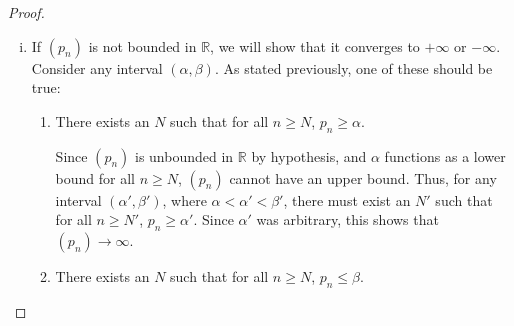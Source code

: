 \documentclass[12pt]{article}
\begin{document}
\begin{proof}
\begin{enumerate}[(i)]
                  Given our paraphrasing of what it means to be cross-bounded, there
                  either exists an $N$ such that for all $n\ge N$, $p_{n}\ge \alpha$, or
                  there exists an $N$ such that for all $n\ge N$, $p_{n} \leq \beta$. In both
                  cases, we have achieved new bounds for $(p_{n})$ for $n\ge N$, namely
                  $(\alpha, M)$ and $(m, \beta)$ respectively. Notice that
                  $M-a = \beta-m = \frac{3}{4}(M-m)$. Effectively, we have bounded a
                  tail of the sequence in an interval that is three-fourths the size of the
                  interval we started with. If we repeat this process $k$ times (always taking
                  the maximum of all the $N$'s we've chosen), we will bound a tail of
                  $(p_{n})$ in an interval of the size $\left( \frac{3}{4} \right)^{k}(M-m)$.
                  Taking the limit as $k\to \infty$,
                  $$
                        \lim_{ k \to \infty } (M-m)\left( \frac{3}{4} \right)^{k} = (M-m)\lim_{ k \to \infty }\left( \frac{3}{4} \right)^{k} = 0
                  $$
                  Thus, for arbitrary $\epsilon>0$, there will exist $k$ such
                  that $(M-m) \left( \frac{3}{4} \right)^{k}<\epsilon$, i.e, there will exist
                  a tail of $(p_{n})$ where the difference between any two terms is less
                  than $\epsilon$. This implies that $(p_{n})$ is Cauchy, and hence, convergent.
            \item If $(p_{n})$ is not bounded in $\mathbb{R}$, we will show that it converges
                  to $+\infty$ or $-\infty$. Consider any interval $(\alpha, \beta)$. As stated
                  previously, one of these should be true:
                  \begin{enumerate}[]
                        \item There exists an $N$ such that for all $n\ge N$, $p_{n} \geq \alpha$.

                              Since $(p_{n})$ is unbounded in $\mathbb{R}$ by hypothesis,
                              and $\alpha$ functions as a lower bound for all
                              $n\ge N$, $(p_{n})$ cannot have an upper bound. Thus, for any
                              interval $(\alpha', \beta')$, where $\alpha<\alpha'<\beta'$,
                              there must exist an $N'$ such that for all
                              $n\ge N'$,  $p_{n}\ge \alpha'$. Since $\alpha'$ was arbitrary,
                              this shows that $(p_{n})\to \infty$.
                        \item There exists an $N$ such that for all $n\ge N$, $p_{n} \leq \beta$.


\end{enumerate}
\end{enumerate}
\end{proof}
\end{document}
